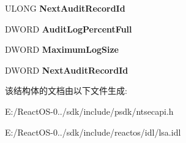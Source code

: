 \begin{DoxyCompactItemize}
U\+L\+O\+NG {\bfseries Next\+Audit\+Record\+Id}
\item 
\mbox{\label{struct___p_o_l_i_c_y___a_u_d_i_t___l_o_g___i_n_f_o_ae86fa38a27cf3b9ff2c495d2159a93c0}} 
D\+W\+O\+RD {\bfseries Audit\+Log\+Percent\+Full}
\item 
\mbox{\label{struct___p_o_l_i_c_y___a_u_d_i_t___l_o_g___i_n_f_o_ae67c7a2a2cdda91e0498c418e22776b2}} 
D\+W\+O\+RD {\bfseries Maximum\+Log\+Size}
\item 
\mbox{\label{struct___p_o_l_i_c_y___a_u_d_i_t___l_o_g___i_n_f_o_a1d78fc4eec8bbcf26757f791aaab5fb1}} 
D\+W\+O\+RD {\bfseries Next\+Audit\+Record\+Id}
\end{DoxyCompactItemize}


该结构体的文档由以下文件生成\+:\begin{DoxyCompactItemize}
\item 
E\+:/\+React\+O\+S-\/0../sdk/include/psdk/ntsecapi.\+h\item 
E\+:/\+React\+O\+S-\/0../sdk/include/reactos/idl/lsa.\+idl\end{DoxyCompactItemize}
